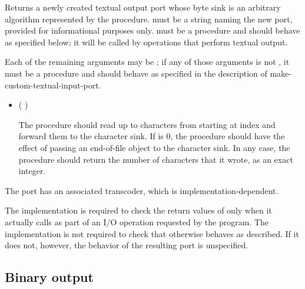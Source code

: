 \begin{entry}{%
}

Returns a newly created textual output port whose byte sink is
an arbitrary algorithm represented by the  procedure.
 must be a string naming the new port,
provided for informational purposes only.
 must be a procedure and should behave as specified
below; it will be called by operations that perform textual output.

Each of the remaining arguments may be \schfalse{}; if any of
those arguments is not \schfalse{}, it must be a procedure and
should behave as specified in the description of
{\cf make-custom-textual-input-port}.
   
\begin{itemize}
\item {\cf (   )}
       
  The  procedure should read up to  characters
  from  starting at index  and forward
  them to the character sink.
  If  is 0, the  procedure should
  have the effect of passing an end-of-file object to the character sink.
  In any case, the  procedure should return the number of
  characters that it wrote, as an exact integer.
\end{itemize}

The port has an associated transcoder, which is implementation-dependent.

\implresp The implementation is required to check the return
values of  only when it actually calls  as part of
an I/O operation requested by the program.  The implementation is not
required to check that  otherwise behaves as described.
If it does not, however, the behavior of the resulting port is
unspecified.
\end{entry}

\subsection{Binary output}

